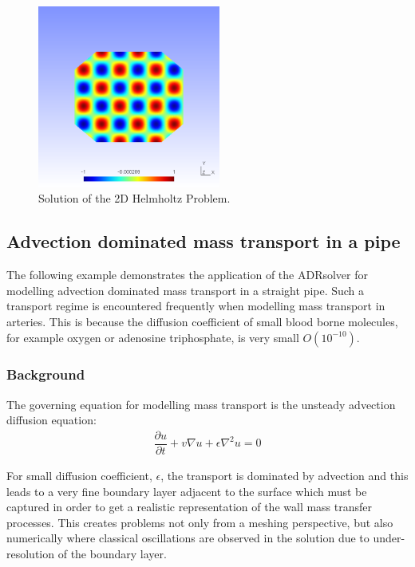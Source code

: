 \begin{figure}
\begin{center}
\includegraphics[width=6cm]{Figures/Helmholtz2D}
\caption{Solution of the 2D Helmholtz Problem.}
\label{f:adrsolver:helmholtz2D}
\end{center}
\end{figure}


\subsection{Advection dominated mass transport in a pipe}

The following example demonstrates the application of the ADRsolver for
modelling advection dominated mass transport in a straight pipe.
Such a transport regime is encountered frequently when modelling mass transport
in arteries. This is because the diffusion coefficient of small blood borne
molecules, for example oxygen or adenosine triphosphate, is very small
$O(10^{-10})$.

\subsubsection{Background}
The governing equation for modelling mass transport is the unsteady advection
diffusion equation:
\begin{align*}
\dfrac{\partial u}{\partial t}  + v\nabla u +  \epsilon \nabla^2 u = 0
\end{align*}

For small diffusion coefficient, $\epsilon$, the transport is dominated by
advection and this leads to a very fine boundary layer adjacent to the surface
which must be captured in order to get a realistic representation of the wall
mass transfer processes. This creates problems not only from a meshing
perspective, but also numerically where classical oscillations are observed in
the solution due to under-resolution of the boundary layer.

